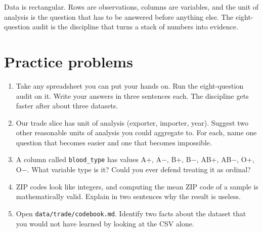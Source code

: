 \documentclass[
  letterpaper,
  11pt,
  twoside,
  openany]{scrbook}
\begin{document}
\begin{tcolorbox}[enhanced jigsaw, arc=.35mm, bottomrule=.15mm, bottomtitle=1mm, breakable, colback=white, colbacktitle=quarto-callout-warning-color!10!white, colframe=quarto-callout-warning-color-frame, coltitle=black, left=2mm, leftrule=.75mm, opacityback=0, opacitybacktitle=0.6, rightrule=.15mm, title=\textcolor{quarto-callout-warning-color}{\faExclamationTriangle}\hspace{0.5em}{Key insight}, titlerule=0mm, toprule=.15mm, toptitle=1mm]

Data is rectangular. Rows are observations, columns are variables, and
the unit of analysis is the question that has to be answered before
anything else. The eight-question audit is the discipline that turns a
stack of numbers into evidence.

\end{tcolorbox}

\section{Practice problems}\label{practice-problems}

\begin{enumerate}
\def\labelenumi{\arabic{enumi}.}
\item
  Take any spreadsheet you can put your hands on. Run the eight-question
  audit on it. Write your answers in three sentences each. The
  discipline gets faster after about three datasets.
\item
  Our trade slice has unit of analysis (exporter, importer, year).
  Suggest two other reasonable units of analysis you could aggregate to.
  For each, name one question that becomes easier and one that becomes
  impossible.
\item
  A column called \texttt{blood\_type} has values A+, A−, B+, B−, AB+,
  AB−, O+, O−. What variable type is it? Could you ever defend treating
  it as ordinal?
\item
  ZIP codes look like integers, and computing the mean ZIP code of a
  sample is mathematically valid. Explain in two sentences why the
  result is useless.
\item
  Open \texttt{data/trade/codebook.md}. Identify two facts about the
  dataset that you would not have learned by looking at the CSV alone.
\end{enumerate}
\end{document}
